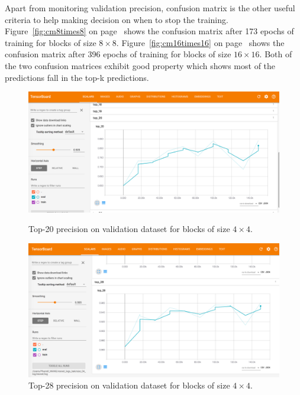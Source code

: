 Apart from monitoring validation precision,
confusion matrix is the other useful criteria 
to help making decision on when to stop the 
training.
Figure~\ref{fig:cm8times8}
on page~\pageref{fig:cm8times8} shows the confusion
matrix after 173 epochs of training for blocks
of size \(8\times8\).
Figure~\ref{fig:cm16times16}
on page~\pageref{fig:cm16times16} shows the confusion
matrix after 396 epochs of training for blocks
of size \(16\times16\).
Both of the two confusion matrices exhibit
good property which shows most of the predictions
fall in the top-k predictions.

\begin{figure}
    \begin{minipage}{0.98\textwidth}
    \includegraphics[width=\textwidth,height=\textheight,keepaspectratio]{Figures/blk-4--top-20.png}
    \caption[Top-20 precision on validation dataset for blocks of size \(4\times4\)]{
        Top-20 precision on validation dataset for blocks of size \(4\times4\).
        }\label{fig:top20for4times4}
    \end{minipage}
    
    \vspace*{1cm} %

    \begin{minipage}{0.98\textwidth}
    \includegraphics[width=\textwidth,height=\textheight,keepaspectratio]{Figures/blk-4--top-28.png}
    \caption[Top-28 precision on validation dataset for blocks of size \(4\times4\)]{
        Top-28 precision on validation dataset for blocks of size \(4\times4\).
        }\label{fig:top28for4times4}
    \end{minipage}
\end{figure}

